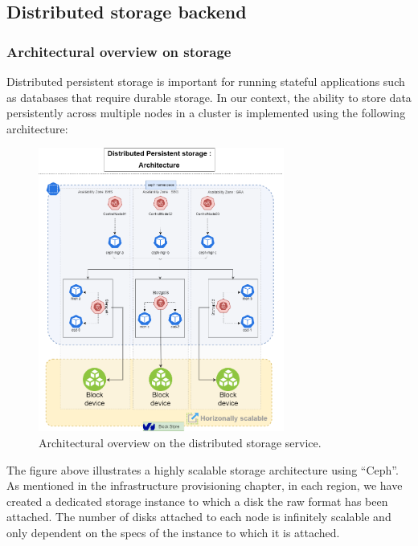 \newpage

\subsection{Distributed storage backend}

\subsubsection{Architectural overview on storage}

\hspace{7mm}Distributed persistent storage is important for running stateful applications such as databases that require durable storage. In our context, the ability to store data persistently across multiple nodes in a cluster is implemented using the following architecture: 

\begin{figure}[H]\centering
\includegraphics[width=0.72\textwidth,angle=00]{assets/f26.png}
\caption{Architectural overview on the distributed storage service.}
\label{fig:Architectural overview on storage}
\end{figure}

\hspace{7mm}The figure above illustrates a highly scalable storage architecture using “Ceph”. As mentioned in the infrastructure provisioning chapter, in each region, we have created a dedicated storage instance to which a disk the raw format has been attached. The number of disks attached to each node is infinitely scalable and only dependent on the specs of the instance to which it is attached.

